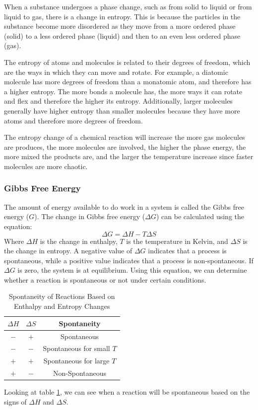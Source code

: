 When a substance undergoes a phase change, such as from solid to liquid or from liquid to gas, there is a change in entropy. This is because the particles in the substance become more disordered as they move from a more ordered phase (solid) to a less ordered phase (liquid) and then to an even less ordered phase (gas). 

The entropy of atoms and molecules is related to their degrees of freedom, which are the ways in which they can move and rotate. For example, a diatomic molecule has more degrees of freedom than a monatomic atom, and therefore has a higher entropy. The more bonds a molecule has, the more ways it can rotate and flex and therefore the higher its entropy. Additionally, larger molecules generally have higher entropy than smaller molecules because they have more atoms and therefore more degrees of freedom.

The entropy change of a chemical reaction will increase the more gas molecules are produces, the more molecules are involved, the higher the phase energy, the more mixed the products are, and the larger the temperature increase since faster molecules are more chaotic. 
\subsubsection{Gibbs Free Energy}
The amount of energy available to do work in a system is called the Gibbs free energy ($G$). The change in Gibbs free energy ($\Delta G$) can be calculated using the equation:
\begin{equation}\label{eq:free_energy}
    \Delta G = \Delta H - T\Delta S
\end{equation}
Where $\Delta H$ is the change in enthalpy, $T$ is the temperature in Kelvin, and $\Delta S$ is the change in entropy. A negative value of $\Delta G$ indicates that a process is spontaneous, while a positive value indicates that a process is non-spontaneous. If $\Delta G$ is zero, the system is at equilibrium. Using this equation, we can determine whether a reaction is spontaneous or not under certain conditions. 
\begin{table}[ht]
    \centering
    \begin{tabular}{c c c}
        $\Delta H$ & $\Delta S$ & Spontaneity \\
        \hline
        $-$ & $+$ & Spontaneous \\
        $-$ & $-$ & Spontaneous for small $T$ \\
        $+$ & $+$ & Spontaneous for large $T$ \\
        $+$ & $-$ & Non-Spontaneous \\
    \end{tabular}
    \caption{Spontaneity of Reactions Based on Enthalpy and Entropy Changes}
    \label{table:spontaneity}
\end{table}
Looking at table \ref{table:spontaneity}, we can see when a reaction will be spontaneous based on the signs of $\Delta H$ and $\Delta S$. 
